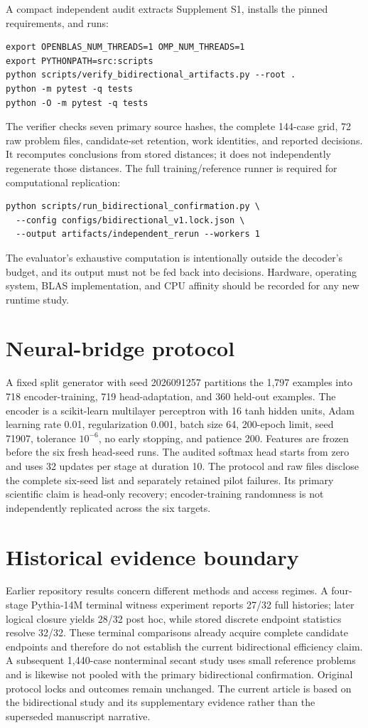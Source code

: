 A compact independent audit extracts Supplement S1, installs the pinned requirements, and runs:
\begin{verbatim}
export OPENBLAS_NUM_THREADS=1 OMP_NUM_THREADS=1
export PYTHONPATH=src:scripts
python scripts/verify_bidirectional_artifacts.py --root .
python -m pytest -q tests
python -O -m pytest -q tests
\end{verbatim}
The verifier checks seven primary source hashes, the complete 144-case grid, 72 raw problem files, candidate-set retention, work identities, and reported decisions. It recomputes conclusions from stored distances; it does not independently regenerate those distances. The full training/reference runner is required for computational replication:
\begin{verbatim}
python scripts/run_bidirectional_confirmation.py \
  --config configs/bidirectional_v1.lock.json \
  --output artifacts/independent_rerun --workers 1
\end{verbatim}
The evaluator's exhaustive computation is intentionally outside the decoder's budget, and its output must not be fed back into decisions. Hardware, operating system, BLAS implementation, and CPU affinity should be recorded for any new runtime study.

\section{Neural-bridge protocol}
A fixed split generator with seed 2026091257 partitions the 1,797 examples into 718 encoder-training, 719 head-adaptation, and 360 held-out examples. The encoder is a scikit-learn multilayer perceptron with 16 tanh hidden units, Adam learning rate 0.01, regularization 0.001, batch size 64, 200-epoch limit, seed 71907, tolerance $10^{-6}$, no early stopping, and patience 200. Features are frozen before the six fresh head-seed runs. The audited softmax head starts from zero and uses 32 updates per stage at duration 10. The protocol and raw files disclose the complete six-seed list and separately retained pilot failures. Its primary scientific claim is head-only recovery; encoder-training randomness is not independently replicated across the six targets.

\section{Historical evidence boundary}
Earlier repository results concern different methods and access regimes. A four-stage Pythia-14M terminal witness experiment reports 27/32 full histories; later logical closure yields 28/32 post hoc, while stored discrete endpoint statistics resolve 32/32. These terminal comparisons already acquire complete candidate endpoints and therefore do not establish the current bidirectional efficiency claim. A subsequent 1,440-case nonterminal secant study uses small reference problems and is likewise not pooled with the primary bidirectional confirmation. Original protocol locks and outcomes remain unchanged. The current article is based on the bidirectional study and its supplementary evidence rather than the superseded manuscript narrative.

